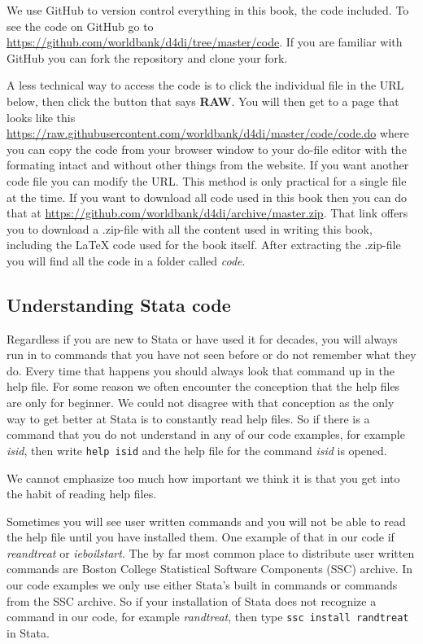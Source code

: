 We use GitHub to version control everything in this book, the code included. To see the code on GitHub go to
\url{https://github.com/worldbank/d4di/tree/master/code}. If you are familiar with GitHub you can
fork the repository and clone your fork. 

A less technical way to access the code is to click the individual file in the URL below, then click
the button that says \textbf{RAW}. You will then get to a page that looks like this
\url{https://raw.githubusercontent.com/worldbank/d4di/master/code/code.do} where you can copy the code
from your browser window to your do-file editor with the formating intact and without other things from
the website. If you want another code file you can modify the URL. This method is only practical for a 
single file at the time. If you want to download all code used in this book then you can do that at
\url{https://github.com/worldbank/d4di/archive/master.zip}. That link offers you to download a .zip-file
with all the content used in writing this book, including the \LaTeX{} code used for the book itself. After 
extracting the .zip-file you will find all the code in a folder called \textit{code}. 

\subsection{Understanding Stata code}

Regardless if you are new to Stata or have used it for decades, you will always run in to commands that 
you have not seen before or do not remember what they do. Every time that happens you should always look 
that command up in the help file. For some reason we often encounter the conception that the help files 
are only for beginner. We could not disagree with that conception as the only way to get better at Stata 
is to constantly read help files. So if there is a command that you do not understand in any of our code 
examples, for example \textit{isid}, then write \verb+help isid+ and the help file for the 
command \textit{isid} is opened.

We cannot emphasize too much how important we think it is that you get into the habit of reading help files.

Sometimes you will see user written commands and you will not be able to read the help file until you have
installed them. One example of that in our code if \textit{reandtreat} or \textit{ieboilstart}. The by far
most common place to distribute user written commands are Boston College Statistical Software Components
(SSC) archive. In our code examples we only use either Stata's built in commands or commands from the 
SSC archive. So if your installation of Stata does not recognize a command in our code, for example 
\textit{randtreat}, then type \verb+ssc install randtreat+ in Stata. 

